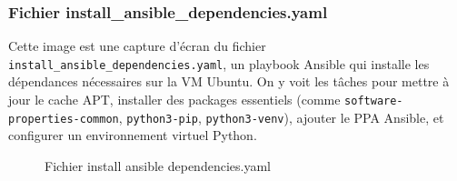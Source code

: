   \subsubsection{Fichier install\_ansible\_dependencies.yaml}
  Cette image est une capture d’écran du fichier \texttt{install\_ansible\_dependencies.yaml}, un playbook Ansible qui installe les dépendances nécessaires sur la VM Ubuntu. On y voit les tâches pour mettre à jour le cache APT, installer des packages essentiels (comme \texttt{software-properties-common}, \texttt{python3-pip}, \texttt{python3-venv}), ajouter le PPA Ansible, et configurer un environnement virtuel Python.
  \begin{figure}[h]
      \vspace*{-1.5cm}
      \begin{adjustwidth}{-3.5cm}{-3.5cm}
      \centering
      \caption{Fichier install ansible dependencies.yaml}
      \label{fig:ansible04}
      \end{adjustwidth}
  \end{figure}
  \clearpage
